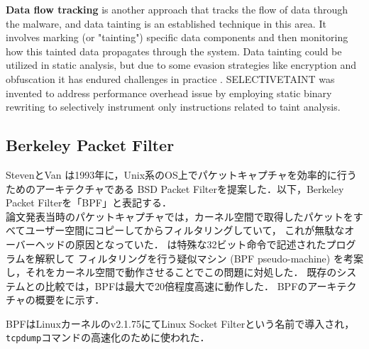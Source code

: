 \textbf{Data flow tracking} is another approach that tracks the flow of data through the malware, and data tainting is an established
technique in this area. It involves marking (or "tainting") specific data components and then monitoring
how this tainted data propagates through the system.
Data tainting could be utilized in static analysis, but due to some evasion strategies like encryption and obfuscation
it has endured challenges in practice \cite{alashjee2019dynamic}.
SELECTIVETAINT \cite{chen2021selectivetaint} was invented to address performance overhead issue by employing static binary
rewriting to selectively instrument only instructions related to taint analysis.




\subsection{Berkeley Packet Filter}
StevenとVan \cite{mccanne1993bsd}は1993年に，Unix系のOS上でパケットキャプチャを効率的に行うためのアーキテクチャである
BSD Packet Filterを提案した．以下，Berkeley Packet Filterを「BPF」と表記する． \\
論文発表当時のパケットキャプチャでは，カーネル空間で取得したパケットをすべてユーザー空間にコピーしてからフィルタリングしていて，
これが無駄なオーバーヘッドの原因となっていた．
\cite{mccanne1993bsd}は特殊な32ビット命令で記述されたプログラムを解釈して
フィルタリングを行う疑似マシン (BPF pseudo-machine) を考案し，それをカーネル空間で動作させることでこの問題に対処した．
既存のシステムとの比較では，BPFは最大で20倍程度高速に動作した．
BPFのアーキテクチャの概要をに示す．

BPFはLinuxカーネルのv2.1.75にてLinux Socket Filterという名前で導入され，\texttt{tcpdump}コマンドの高速化のために使われた．

